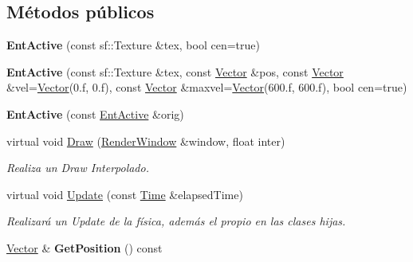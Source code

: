 \subsection*{Métodos públicos}
\begin{DoxyCompactItemize}
\item 
\hypertarget{classEntActive_a81931d25b400fc5e130105485faa709f}{{\bfseries Ent\-Active} (const sf\-::\-Texture \&tex, bool cen=true)}\label{classEntActive_a81931d25b400fc5e130105485faa709f}

\item 
\hypertarget{classEntActive_a5d2b8ee5788d63b5ee728d260baa142d}{{\bfseries Ent\-Active} (const sf\-::\-Texture \&tex, const \hyperlink{classVector}{Vector} \&pos, const \hyperlink{classVector}{Vector} \&vel=\hyperlink{classVector}{Vector}(0.f, 0.f), const \hyperlink{classVector}{Vector} \&maxvel=\hyperlink{classVector}{Vector}(600.f, 600.f), bool cen=true)}\label{classEntActive_a5d2b8ee5788d63b5ee728d260baa142d}

\item 
\hypertarget{classEntActive_a80e6db9b0c09d4e7341bf594644537d6}{{\bfseries Ent\-Active} (const \hyperlink{classEntActive}{Ent\-Active} \&orig)}\label{classEntActive_a80e6db9b0c09d4e7341bf594644537d6}

\item 
virtual void \hyperlink{classEntActive_a658baff215085c022d8a019269185a66}{Draw} (\hyperlink{classRenderWindow}{Render\-Window} \&window, float inter)
\begin{DoxyCompactList}\small\item\em Realiza un Draw Interpolado. \end{DoxyCompactList}\item 
\hypertarget{classEntActive_a5bd08db0c510184d069cd48ee037cbb5}{virtual void \hyperlink{classEntActive_a5bd08db0c510184d069cd48ee037cbb5}{Update} (const \hyperlink{classTime}{Time} \&elapsed\-Time)}\label{classEntActive_a5bd08db0c510184d069cd48ee037cbb5}

\begin{DoxyCompactList}\small\item\em Realizará un Update de la física, además el propio en las clases hijas. \end{DoxyCompactList}\item 
\hypertarget{classEntActive_a7c0d9232f28e3c8f697666a13eedf1fd}{\hyperlink{classVector}{Vector} \& {\bfseries Get\-Position} () const }\label{classEntActive_a7c0d9232f28e3c8f697666a13eedf1fd}


\end{DoxyCompactItemize}

